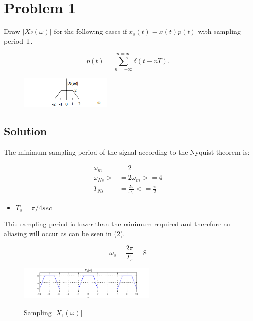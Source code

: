 \section*{Problem 1}

Draw $|Xs(\omega)|$ for the following cases if $x_s(t)=x(t)p(t)$ with sampling period T.

\begin{equation*}
p(t) = \displaystyle\sum_{n=-\infty}^{n=\infty} \delta(t-nT).
\end{equation*} 

\begin{figure}[H]
\caption*{}
\centering
\includegraphics[width=0.4\textwidth]{figs/c3p11.png}
\label{fig:c3p11}
\end{figure} 

\subsection*{Solution}

The minimum sampling period of the signal according to the Nyquist theorem is:

\begin{equation*}
\begin{aligned}
\omega_m &= 2 \\
\omega_{Ns} >&= 2 \omega_m >= 4 \\
T_{Ns} &= \frac{2 \pi}{\omega_s} <= \frac{\pi}{2}
\end{aligned}
\end{equation*} 

\begin{itemize}
\item $T_s = \pi/4 sec$
\end{itemize} 

This sampling period is lower than the minimum required and therefore no
aliasing will occur as can be seen in (\ref{fig:c3p1a}).

\begin{equation*}
\omega_s = \frac{2 \pi}{T_s} = 8 
\end{equation*} 


\begin{figure}[H]
\caption{Sampling $|X_s(\omega)|$}
\centering
\includegraphics[width=0.6\textwidth]{figs/c3p1a.png}
\label{fig:c3p1a}
\end{figure}

